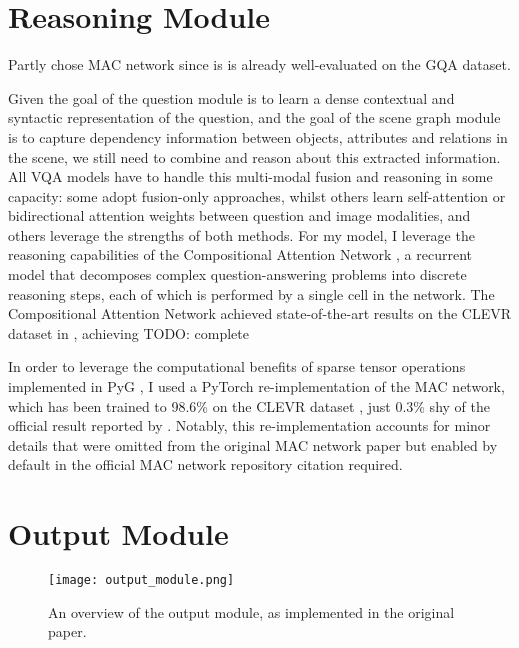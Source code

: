
\section{Reasoning Module}
\label{section:reasoning_module}

{\color{red}Partly chose MAC network since is is already well-evaluated on the GQA dataset.}

Given the goal of the question module is to learn a dense contextual and syntactic representation of the question, and the goal of the scene graph module is to capture dependency information between objects, attributes and relations in the scene, we still need to combine and reason about this extracted information. All VQA models have to handle this multi-modal fusion and reasoning in some capacity: some adopt fusion-only approaches, whilst others learn self-attention or bidirectional attention weights between question and image modalities, and others leverage the strengths of both methods. For my model, I leverage the reasoning capabilities of the Compositional Attention Network \citeauthor{hudson2018compositional}, a recurrent model that decomposes complex question-answering problems into discrete reasoning steps, each of which is performed by a single cell in the network. The Compositional Attention Network achieved state-of-the-art results on the CLEVR dataset in \citeyear{hudson2018compositional}, achieving {\color{red} TODO: complete}

In order to leverage the computational benefits of sparse tensor operations implemented in PyG \cite{fey2019fast}, I used a PyTorch \cite{paszke2019pytorch} re-implementation of the MAC network, which has been trained to 98.6\% on the CLEVR dataset \cite{eyzaguirre2020differentiable}, just 0.3\% shy of the official result reported by 
\citeauthor{hudson2018compositional}. Notably, this re-implementation accounts for minor details that were omitted from the original MAC network paper but enabled by default in the official MAC network repository {\color{red} citation required}.



\section{Output Module}
\label{section:output_module}

\begin{figure}[htbp]
    \centering
    \texttt{[image: output\_module.png]}
    \caption{An overview of the output module, as implemented in the original paper.}
    \label{fig:output_module}
\end{figure}

